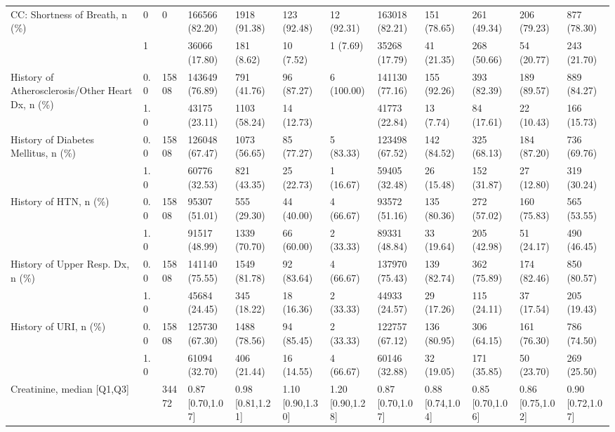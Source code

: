 \begin{tabular}{llllllllllll}
\cline{1-12}
\multirow[t]{2}{*}{CC: Shortness of Breath, n (\%)} & 0 & 0 & 166566 (82.20) & 1918 (91.38) & 123 (92.48) & 12 (92.31) & 163018 (82.21) & 151 (78.65) & 261 (49.34) & 206 (79.23) & 877 (78.30) \\
 & 1 &  & 36066 (17.80) & 181 (8.62) & 10 (7.52) & 1 (7.69) & 35268 (17.79) & 41 (21.35) & 268 (50.66) & 54 (20.77) & 243 (21.70) \\
\cline{1-12}
\multirow[t]{2}{*}{History of Atherosclerosis/Other Heart Dx, n (\%)} & 0.0 & 15808 & 143649 (76.89) & 791 (41.76) & 96 (87.27) & 6 (100.00) & 141130 (77.16) & 155 (92.26) & 393 (82.39) & 189 (89.57) & 889 (84.27) \\
 & 1.0 &  & 43175 (23.11) & 1103 (58.24) & 14 (12.73) &  & 41773 (22.84) & 13 (7.74) & 84 (17.61) & 22 (10.43) & 166 (15.73) \\
\cline{1-12}
\multirow[t]{2}{*}{History of Diabetes Mellitus, n (\%)} & 0.0 & 15808 & 126048 (67.47) & 1073 (56.65) & 85 (77.27) & 5 (83.33) & 123498 (67.52) & 142 (84.52) & 325 (68.13) & 184 (87.20) & 736 (69.76) \\
 & 1.0 &  & 60776 (32.53) & 821 (43.35) & 25 (22.73) & 1 (16.67) & 59405 (32.48) & 26 (15.48) & 152 (31.87) & 27 (12.80) & 319 (30.24) \\
\cline{1-12}
\multirow[t]{2}{*}{History of HTN, n (\%)} & 0.0 & 15808 & 95307 (51.01) & 555 (29.30) & 44 (40.00) & 4 (66.67) & 93572 (51.16) & 135 (80.36) & 272 (57.02) & 160 (75.83) & 565 (53.55) \\
 & 1.0 &  & 91517 (48.99) & 1339 (70.70) & 66 (60.00) & 2 (33.33) & 89331 (48.84) & 33 (19.64) & 205 (42.98) & 51 (24.17) & 490 (46.45) \\
\cline{1-12}
\multirow[t]{2}{*}{History of Upper Resp. Dx, n (\%)} & 0.0 & 15808 & 141140 (75.55) & 1549 (81.78) & 92 (83.64) & 4 (66.67) & 137970 (75.43) & 139 (82.74) & 362 (75.89) & 174 (82.46) & 850 (80.57) \\
 & 1.0 &  & 45684 (24.45) & 345 (18.22) & 18 (16.36) & 2 (33.33) & 44933 (24.57) & 29 (17.26) & 115 (24.11) & 37 (17.54) & 205 (19.43) \\
\cline{1-12}
\multirow[t]{2}{*}{History of URI, n (\%)} & 0.0 & 15808 & 125730 (67.30) & 1488 (78.56) & 94 (85.45) & 2 (33.33) & 122757 (67.12) & 136 (80.95) & 306 (64.15) & 161 (76.30) & 786 (74.50) \\
 & 1.0 &  & 61094 (32.70) & 406 (21.44) & 16 (14.55) & 4 (66.67) & 60146 (32.88) & 32 (19.05) & 171 (35.85) & 50 (23.70) & 269 (25.50) \\
\cline{1-12}
Creatinine, median [Q1,Q3] &  & 34472 & 0.87 [0.70,1.07] & 0.98 [0.81,1.21] & 1.10 [0.90,1.30] & 1.20 [0.90,1.28] & 0.87 [0.70,1.07] & 0.88 [0.74,1.04] & 0.85 [0.70,1.06] & 0.86 [0.75,1.02] & 0.90 [0.72,1.07] \\

\end{tabular}
